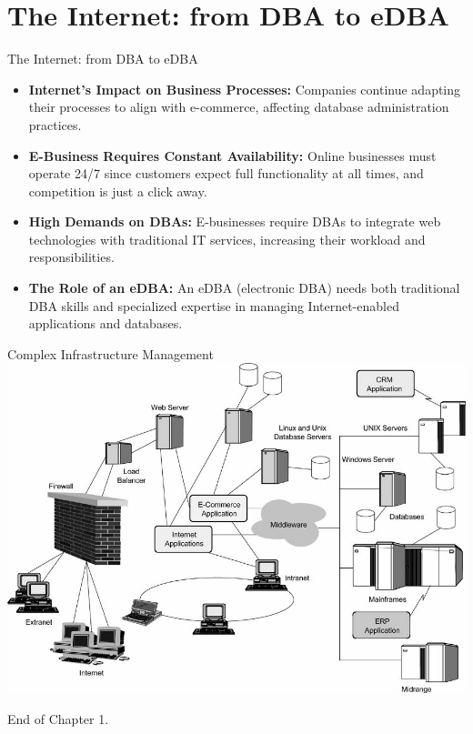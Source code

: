 \documentclass{beamer}
\begin{document}
\section{The Internet: from DBA to eDBA}

\begin{frame}{The Internet: from DBA to eDBA}
    \begin{itemize}
        \item \textbf{Internet's Impact on Business Processes:} Companies continue adapting their processes to align with e-commerce, affecting database administration practices.
        \item \textbf{E-Business Requires Constant Availability:} Online businesses must operate 24/7 since customers expect full functionality at all times, and competition is just a click away.
        \item \textbf{High Demands on DBAs:} E-businesses require DBAs to integrate web technologies with traditional IT services, increasing their workload and responsibilities.
        \item \textbf{The Role of an eDBA:} An eDBA (electronic DBA) needs both traditional DBA skills and specialized expertise in managing Internet-enabled applications and databases.
    \end{itemize}
\end{frame}

\begin{frame}{Complex Infrastructure Management}
    \centering
    \includegraphics[width=\textwidth]{figures/dba_cloud.png}
\end{frame}

\begin{frame}{}
    \centering
    \Huge End of Chapter 1.
\end{frame}
\end{document}
